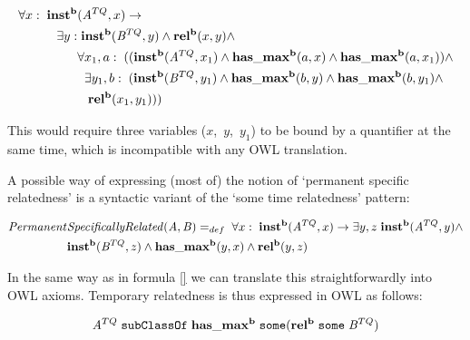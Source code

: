 
 \begin{equation}
\begin{split}
\forall x:\; \mathrm{\mathbf{inst^b}}&(\mathit{A}^{TQ},x) \rightarrow \\
 \exists y:&\;\mathrm{\mathbf{inst^b}}(\mathit{B}^{TQ},y) \wedge \mathrm{\mathbf{rel^b}}(x,y)\wedge\\
 & \forall x_1,a:\; ((\mathrm{\mathbf{inst^b}}(\mathit{A}^{TQ},x_1) \wedge
\mathrm{\mathbf{has\_max^b}}(a,x) \wedge \mathrm{\mathbf{has\_max^b}}(a,x_1))\wedge\\
&\;\;\exists y_1,b:\;(\mathrm{\mathbf{inst^b}}(\mathit{B}^{TQ},y_1) \wedge \mathrm{\mathbf{has\_max^b}}(b,y)  
\wedge \mathrm{\mathbf{has\_max^b}}(b,y_1) \wedge\\&\;\;\;\mathrm{\mathbf{rel^b}}(x_1,y_1)))
\end{split}
\end{equation}

This would require three variables ($x$,~$y$,~$y_1$) to be bound by a quantifier at the same
time, which is incompatible with any OWL translation.



A possible way of expressing (most of) the notion of `permanent specific 
relatedness' is a syntactic variant of the `some time relatedness' pattern:
 
\begin{equation}
\begin{split}
\mathit{Permanent}&\mathit{SpecificallyRelated}(\mathit{A},\mathit{B}) =_{def}\;
\forall x:\; \mathrm{\mathbf{inst^b}}(\mathit{A}^{TQ}, x)
 \rightarrow
\exists y,z \; \mathrm{\mathbf{inst^b}}(\mathit{A}^{TQ},y) \wedge \\ & \mathrm{\mathbf{inst^b}}(\mathit{B}^{TQ},z)
 \wedge \mathrm{\mathbf{has\_max^b}}(y,x) \wedge \mathrm{\mathbf{rel^b}}(y,z)
\end{split}
\label{eq:usesPermSpec}
\end{equation}
 

In the same way as in formula \ref{} we can translate this straightforwardly into OWL
axioms. Temporary relatedness is thus expressed in OWL as follows:

\begin{equation}
\mathit{A}^{TQ}\;\mathtt{subClassOf}\;\mathrm{\mathbf{has\_max^b}}\;\mathtt{some
(}\mathrm{\mathbf{rel^b}}\;\mathtt{some}\;\mathit{B}^{TQ})
\label{eq:tqc:temp2}
\end{equation}






